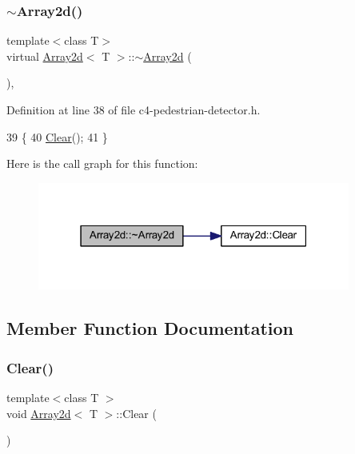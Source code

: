 \subsubsection{\texorpdfstring{$\sim$\+Array2d()}{~Array2d()}}
{\footnotesize\ttfamily template$<$class T$>$ \\
virtual \mbox{\hyperlink{class_array2d}{Array2d}}$<$ T $>$\+::$\sim$\mbox{\hyperlink{class_array2d}{Array2d}} (\begin{DoxyParamCaption}{ }\end{DoxyParamCaption})\hspace{0.3cm}{\ttfamily [inline]}, {\ttfamily [virtual]}}



Definition at line 38 of file c4-\/pedestrian-\/detector.\+h.


\begin{DoxyCode}
39     \{
40         \mbox{\hyperlink{class_array2d_a9902a80867777fbf3ba64a6d8c10606e}{Clear}}();
41     \}
\end{DoxyCode}
Here is the call graph for this function\+:\nopagebreak
\begin{figure}[H]
\begin{center}
\leavevmode
\includegraphics[width=291pt]{class_array2d_afe31cffbc2b8bc84153ec3ad7e40a0e2_cgraph}
\end{center}
\end{figure}


\subsection{Member Function Documentation}
\mbox{\label{class_array2d_a9902a80867777fbf3ba64a6d8c10606e}} 
\subsubsection{\texorpdfstring{Clear()}{Clear()}}
{\footnotesize\ttfamily template$<$class T $>$ \\
void \mbox{\hyperlink{class_array2d}{Array2d}}$<$ T $>$\+::Clear (\begin{DoxyParamCaption}{ }\end{DoxyParamCaption})}




